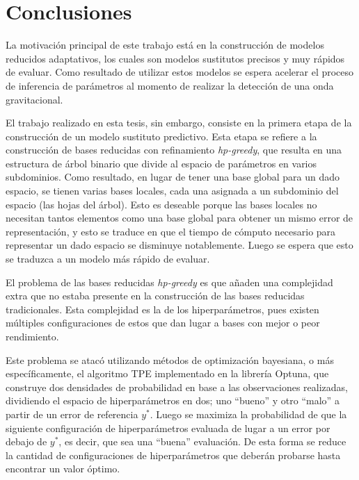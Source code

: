 \chapter{Conclusiones}



La motivación principal de este trabajo está en la construcción de modelos reducidos adaptativos, los cuales son modelos sustitutos precisos y muy rápidos de evaluar. Como resultado de utilizar estos modelos se espera acelerar el proceso de inferencia de parámetros al momento de realizar la detección de una onda gravitacional.  


El trabajo realizado en esta tesis, sin embargo, consiste en la primera etapa de la construcción de un modelo sustituto predictivo. Esta etapa se refiere a la construcción de bases reducidas con refinamiento \textit{hp-greedy}, que resulta en una estructura de árbol binario que divide al espacio de parámetros en varios subdominios. Como resultado, en lugar de tener una base global para un dado espacio, se tienen varias bases locales, cada una asignada a un subdominio del espacio (las hojas del árbol). Esto es deseable porque las bases locales no necesitan tantos elementos como una base global para obtener un mismo error de representación, y esto se traduce en que el tiempo de cómputo necesario para representar un dado espacio se disminuye notablemente. Luego se espera que esto se traduzca a un modelo más rápido de evaluar.



El problema de las bases reducidas \textit{hp-greedy} es que añaden una complejidad extra que no estaba presente en la construcción de las bases reducidas tradicionales. Esta complejidad es la de los hiperparámetros, pues existen múltiples configuraciones de estos que dan lugar a bases con mejor o peor rendimiento.


Este problema se atacó utilizando métodos de optimización bayesiana, o más específicamente, el algoritmo TPE implementado en la librería Optuna, que construye dos densidades de probabilidad en base a las observaciones realizadas, dividiendo el espacio de hiperparámetros en dos; uno ``bueno'' y otro ``malo'' a partir de un error de referencia $y^*$. Luego se maximiza la probabilidad de que la siguiente configuración de hiperparámetros evaluada de lugar a un error por debajo de $y^*$, es decir, que sea una ``buena'' evaluación. De esta forma se reduce la cantidad de configuraciones de hiperparámetros que deberán probarse hasta encontrar un valor óptimo.

